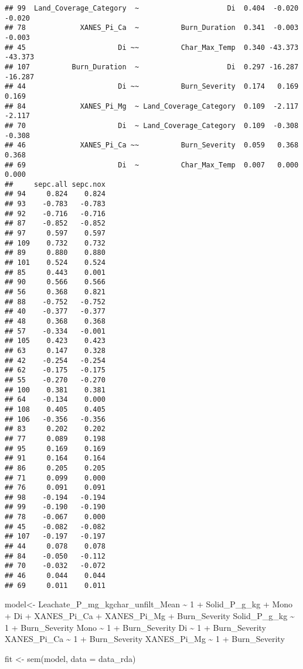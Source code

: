 \documentclass[
]{article}
\newenvironment{Shaded}{\begin{snugshade}}{\end{snugshade}}
\newcommand{\AttributeTok}[1]{\textcolor[rgb]{0.77,0.63,0.00}{#1}}
\newcommand{\FunctionTok}[1]{\textcolor[rgb]{0.00,0.00,0.00}{#1}}
\newcommand{\NormalTok}[1]{#1}
\newcommand{\OtherTok}[1]{\textcolor[rgb]{0.56,0.35,0.01}{#1}}
\newcommand{\StringTok}[1]{\textcolor[rgb]{0.31,0.60,0.02}{#1}}
\begin{document}
\begin{verbatim}
## 99  Land_Coverage_Category  ~                     Di  0.404  -0.020  -0.020
## 78             XANES_Pi_Ca  ~          Burn_Duration  0.341  -0.003  -0.003
## 45                      Di ~~          Char_Max_Temp  0.340 -43.373 -43.373
## 107          Burn_Duration  ~                     Di  0.297 -16.287 -16.287
## 44                      Di ~~          Burn_Severity  0.174   0.169   0.169
## 84             XANES_Pi_Mg  ~ Land_Coverage_Category  0.109  -2.117  -2.117
## 70                      Di  ~ Land_Coverage_Category  0.109  -0.308  -0.308
## 46             XANES_Pi_Ca ~~          Burn_Severity  0.059   0.368   0.368
## 69                      Di  ~          Char_Max_Temp  0.007   0.000   0.000
##     sepc.all sepc.nox
## 94     0.824    0.824
## 93    -0.783   -0.783
## 92    -0.716   -0.716
## 87    -0.852   -0.852
## 97     0.597    0.597
## 109    0.732    0.732
## 89     0.880    0.880
## 101    0.524    0.524
## 85     0.443    0.001
## 90     0.566    0.566
## 56     0.368    0.821
## 88    -0.752   -0.752
## 40    -0.377   -0.377
## 48     0.368    0.368
## 57    -0.334   -0.001
## 105    0.423    0.423
## 63     0.147    0.328
## 42    -0.254   -0.254
## 62    -0.175   -0.175
## 55    -0.270   -0.270
## 100    0.381    0.381
## 64    -0.134    0.000
## 108    0.405    0.405
## 106   -0.356   -0.356
## 83     0.202    0.202
## 77     0.089    0.198
## 95     0.169    0.169
## 91     0.164    0.164
## 86     0.205    0.205
## 71     0.099    0.000
## 76     0.091    0.091
## 98    -0.194   -0.194
## 99    -0.190   -0.190
## 78    -0.067    0.000
## 45    -0.082   -0.082
## 107   -0.197   -0.197
## 44     0.078    0.078
## 84    -0.050   -0.112
## 70    -0.032   -0.072
## 46     0.044    0.044
## 69     0.011    0.011
\end{verbatim}

\begin{Shaded}
\begin{Highlighting}[]
\NormalTok{model}\OtherTok{\textless{}{-}}\StringTok{\textquotesingle{}}
\StringTok{Leachate\_P\_mg\_kgchar\_unfilt\_Mean \textasciitilde{} 1 + Solid\_P\_g\_kg + Mono + Di + XANES\_Pi\_Ca + XANES\_Pi\_Mg + Burn\_Severity}
\StringTok{Solid\_P\_g\_kg \textasciitilde{} 1 + Burn\_Severity}
\StringTok{Mono \textasciitilde{} 1 + Burn\_Severity}
\StringTok{Di \textasciitilde{} 1 + Burn\_Severity}
\StringTok{XANES\_Pi\_Ca \textasciitilde{} 1 + Burn\_Severity}
\StringTok{XANES\_Pi\_Mg \textasciitilde{} 1 + Burn\_Severity }
\StringTok{\textquotesingle{}}

\NormalTok{fit }\OtherTok{\textless{}{-}} \FunctionTok{sem}\NormalTok{(model, }\AttributeTok{data =}\NormalTok{ data\_rda)}
\end{Highlighting}
\end{Shaded}
\end{document}
